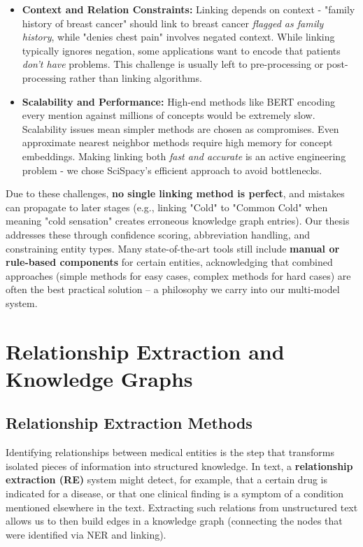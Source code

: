 \begin{itemize}
  \item \textbf{Context and Relation Constraints:} Linking depends on context - "family history of breast cancer" should link to breast cancer \emph{flagged as family history}, while "denies chest pain" involves negated context. While linking typically ignores negation, some applications want to encode that patients \emph{don't have} problems. This challenge is usually left to pre-processing or post-processing rather than linking algorithms.

  \item \textbf{Scalability and Performance:} High-end methods like BERT encoding every mention against millions of concepts would be extremely slow. Scalability issues mean simpler methods are chosen as compromises. Even approximate nearest neighbor methods require high memory for concept embeddings. Making linking both \emph{fast and accurate} is an active engineering problem - we chose SciSpacy's efficient approach to avoid bottlenecks.
\end{itemize}

Due to these challenges, \textbf{no single linking method is perfect}, and mistakes can propagate to later stages (e.g., linking "Cold" to "Common Cold" when meaning "cold sensation" creates erroneous knowledge graph entries). Our thesis addresses these through confidence scoring, abbreviation handling, and constraining entity types. Many state-of-the-art tools still include \textbf{manual or rule-based components} for certain entities, acknowledging that combined approaches (simple methods for easy cases, complex methods for hard cases) are often the best practical solution – a philosophy we carry into our multi-model system.

\section{Relationship Extraction and Knowledge Graphs}

\subsection{Relationship Extraction Methods}

Identifying relationships between medical entities is the step that transforms isolated pieces of information into structured knowledge. In text, a \textbf{relationship extraction (RE)} system might detect, for example, that a certain drug is indicated for a disease, or that one clinical finding is a symptom of a condition mentioned elsewhere in the text. Extracting such relations from unstructured text allows us to then build edges in a knowledge graph (connecting the nodes that were identified via NER and linking).

